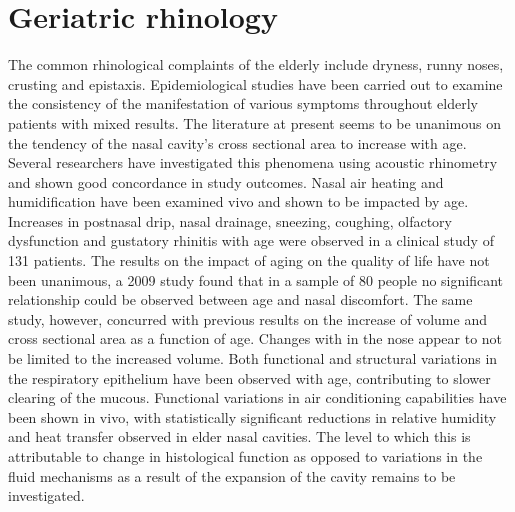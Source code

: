 
\section{Geriatric rhinology}
The common rhinological complaints of the elderly include dryness, runny noses, crusting and epistaxis\cite{Varga-Huettner2013}. Epidemiological studies have been carried out to examine the consistency of the manifestation of various symptoms throughout elderly patients with mixed results. The literature at present seems to be unanimous on the tendency of the nasal cavity's cross sectional area to increase with age. Several researchers have investigated this phenomena using acoustic rhinometry and shown good concordance in study outcomes\cite{Kalmovich2005, Edelstein1996,WhanKim2007,Lindemann2008}. Nasal air heating and humidification have been examined vivo and shown to be impacted by age\cite{Lindemann2008}. Increases in postnasal drip, nasal drainage, sneezing, coughing, olfactory dysfunction and gustatory rhinitis with age were observed in a clinical study of 131 patients\cite{Edelstein1996}. The results on the impact of aging on the quality of life have not been unanimous, a 2009 study found that in a sample of 80 people no significant relationship could be observed between age and nasal discomfort\cite{Lindemann2010}. The same study, however, concurred with previous results on the increase of volume and cross sectional area as a function of age. Changes with in the nose appear to not be limited to the increased volume. Both functional and structural variations in the respiratory epithelium have been observed with age, contributing to slower clearing of the mucous\cite{HO2001}. Functional variations in air conditioning capabilities have been shown in vivo\cite{Lindemann2008}, with statistically significant reductions in relative humidity and heat transfer observed in elder nasal cavities. The level to which this is attributable to change in histological function as opposed to variations in the fluid mechanisms as a result of the expansion of the cavity remains to be investigated.

